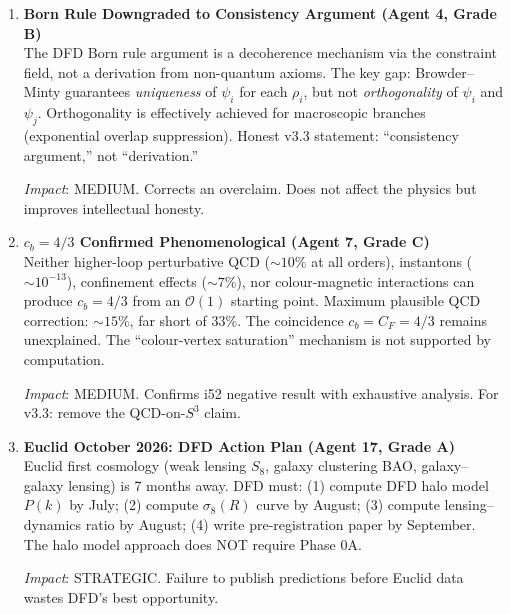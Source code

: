 \documentclass[11pt,a4paper]{article}
\begin{document}
\begin{enumerate}[label=\textbf{\arabic*.}, leftmargin=1.5cm]
\textit{Impact}: MEDIUM. The result is correct but v3.3 must include a ``Convention'' box to prevent future confusion.

\item \textbf{Born Rule Downgraded to Consistency Argument (Agent 4, Grade B)}\\
The DFD Born rule argument is a decoherence mechanism via the constraint field, not a derivation from non-quantum axioms. The key gap: Browder--Minty guarantees \emph{uniqueness} of $\psi_i$ for each $\rho_i$, but not \emph{orthogonality} of $\psi_i$ and $\psi_j$. Orthogonality is effectively achieved for macroscopic branches (exponential overlap suppression). Honest v3.3 statement: ``consistency argument,'' not ``derivation.''

\textit{Impact}: MEDIUM. Corrects an overclaim. Does not affect the physics but improves intellectual honesty.

\item \textbf{$c_b = 4/3$ Confirmed Phenomenological (Agent 7, Grade C)}\\
Neither higher-loop perturbative QCD ($\sim 10\%$ at all orders), instantons ($\sim 10^{-13}$), confinement effects ($\sim 7\%$), nor colour-magnetic interactions can produce $c_b = 4/3$ from an $\mathcal{O}(1)$ starting point. Maximum plausible QCD correction: $\sim 15\%$, far short of $33\%$. The coincidence $c_b = C_F = 4/3$ remains unexplained. The ``colour-vertex saturation'' mechanism is not supported by computation.

\textit{Impact}: MEDIUM. Confirms i52 negative result with exhaustive analysis. For v3.3: remove the QCD-on-$S^3$ claim.

\item \textbf{Euclid October 2026: DFD Action Plan (Agent 17, Grade A)}\\
Euclid first cosmology (weak lensing $S_8$, galaxy clustering BAO, galaxy--galaxy lensing) is 7 months away. DFD must: (1) compute DFD halo model $P(k)$ by July; (2) compute $\sigma_8(R)$ curve by August; (3) compute lensing--dynamics ratio by August; (4) write pre-registration paper by September. The halo model approach does NOT require Phase 0A.

\textit{Impact}: STRATEGIC. Failure to publish predictions before Euclid data wastes DFD's best opportunity.

\end{enumerate}


\end{document}
